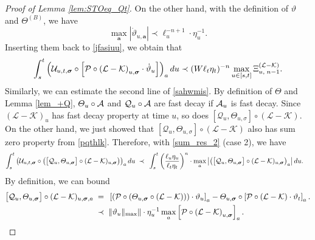 \documentclass[10pt,reqno]{article}
\theoremstyle{plain} %
\theoremstyle{remark}
\numberwithin{equation}{section}
\begin{document}
\begin{proof}[Proof of Lemma \ref{lem:STOeq_Qt}]
  
 On the other hand, with the definition of $\vartheta$ and $\Theta^{(B)}$, we have 
$$
   \max_{\textbf{a}}\left| 
       \dot \vartheta_{u,\textbf{a} } \right|\prec \ell_u^{-n+1}\cdot \eta_u^{-1}.  
$$
 Inserting them back to \eqref{jfasiuu}, we obtain that
\begin{align}\label{kkuuwsaf}
  \int_{s}^t 
     \left(\mathcal{U}_{u, t, \boldsymbol{\sigma}} 
     \circ \left[ {\cal P} \circ
      \left(\mathcal{L} - \mathcal{K}\right)_{u, \boldsymbol{\sigma}}
        \cdot \dot \vartheta_{u } \right]\right)_{\textbf{a}} du  \prec (W\ell_t\eta_t)^{-n}\max_{u\in [s,t]} \Xi^{(\cal L-K)}_{u,\; n-1}. 
 \end{align}
Similarly, we can estimate the second line of \eqref{sahwmis}.  By definition of $\varTheta$ and Lemma \ref{lem_+Q},    $ {\varTheta}_u \circ {\cal A}$ and ${\cal Q}_u  \circ {\cal A}$
 are fast decay  if ${\cal A}_u$ is fast decay. Since $(\mathcal{L}-\mathcal{K})_u$ has fast decay property at time $u$,  so does $\left[\mathcal{Q}_u, \Theta_{u, \sigma}\right] \circ(\mathcal{L}-\mathcal{K})$.  On the other hand,  we just showed  that $
\left[\mathcal{Q}_u, \Theta_{u, \sigma}\right] \circ(\mathcal{L}-\mathcal{K})
$ also has sum zero property from \eqref{pqthlk}.  
Therefore,  with  \eqref{sum_res_2} (case 2), we have 
\begin{align}\label{jfasiuu222}
 \int_{s}^t 
   \left(\mathcal{U}_{u, t, \boldsymbol{\sigma}} 
     \circ \left( \big[{\cal Q}_u , \varTheta_{u,\boldsymbol{\sigma}} \big]\circ (\mathcal{L} - \mathcal{K}) _{u, \boldsymbol{\sigma} }\right) \right)_{\textbf{a}} du  
         \;   \prec \;&\;\int_s^t \left(\frac{\ell_u\eta_u}{\ell_t\eta_t}\right)^{n}\cdot 
          \max_{a} 
          \left|\left(\big[{\cal Q}_u , \varTheta_{u,\boldsymbol{\sigma}} \big]\circ (\mathcal{L} - \mathcal{K}) _{u, \boldsymbol{\sigma} }\right)_{\textbf{a}}\right|du.
\end{align}
By definition, we can bound 
\begin{align}
   \big[{\cal Q}_u , \varTheta_{u,\boldsymbol{\sigma}} \big]\circ (\mathcal{L} - \mathcal{K}) _{u, \boldsymbol{\sigma}, \textbf{a}}
   \;=\; & \; \left[ \left({\cal P} \circ \left(\varTheta_{u, \boldsymbol{\sigma}} \circ (\mathcal{L} - \mathcal{K})\right)\right) \cdot \vartheta_u \right]_{\textbf{a}} 
    - \varTheta_{u, \boldsymbol{\sigma}} \circ \left[ {\cal P} \circ \left( \mathcal{L} - \mathcal{K} \right) \cdot \vartheta_t \right]_{\textbf{a}}.
\\\nonumber
 \;\prec \; & \;  \|\vartheta_u\|_{\max}\|\cdot \eta_u^{-1}\max_a\left[ {\cal P} \circ \left(  \mathcal{L} - \mathcal{K} \right)_{u,\boldsymbol{\sigma}} \right]_{a} .

\end{align}
\end{proof}
\end{document}
